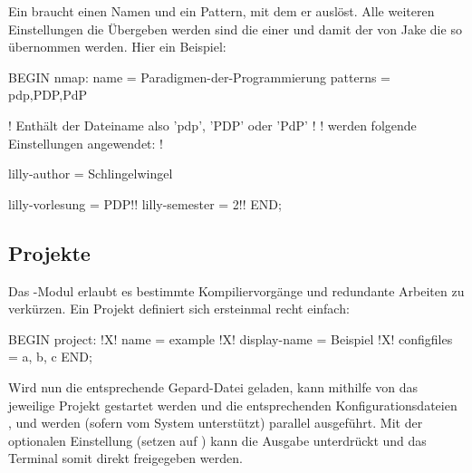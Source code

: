 Ein  braucht einen Namen und ein Pattern, mit dem er auslöst. Alle weiteren Einstellungen die Übergeben werden sind die einer  und damit der  von Jake die so übernommen werden. Hier ein Beispiel:
\begin{gepard}
BEGIN nmap:
    name            = Paradigmen-der-Programmierung
    patterns        = pdp,PDP,PdP

    ! Enthält der Dateiname also 'pdp', 'PDP' oder 'PdP' !
    ! werden folgende Einstellungen angewendet:          !

    lilly-author    = Schlingelwingel

    lilly-vorlesung = PDP!!
    lilly-semester  = 2!!
END;
\end{gepard}

\subsection{Projekte}
Das -Modul erlaubt es bestimmte Kompiliervorgänge und redundante Arbeiten zu verkürzen. Ein Projekt definiert sich ersteinmal recht einfach:
\begin{gepard}
BEGIN project:
!X!    name          = example
!X!    display-name  = Beispiel
!X!    configfiles   = a, b, c
END;
\end{gepard}
Wird nun die entsprechende Gepard-Datei geladen, kann mithilfe von  das jeweilige Projekt gestartet werden und die entsprechenden Konfigurationsdateien ,  und  werden (sofern vom System unterstützt) parallel ausgeführt. Mit der optionalen Einstellung  (setzen auf ) kann die Ausgabe unterdrückt und das Terminal somit direkt freigegeben werden.

